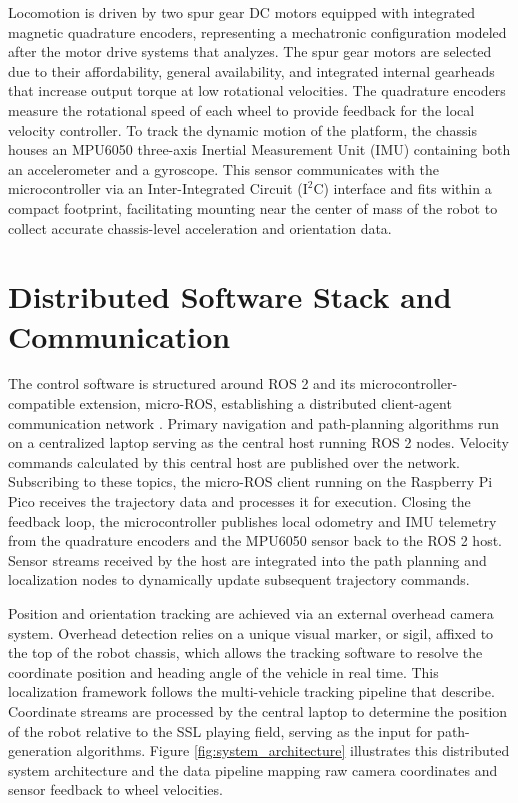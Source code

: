 \documentclass[a4paper,twoside,12pt]{report}
\begin{document}
Locomotion is driven by two spur gear DC motors equipped with integrated magnetic quadrature encoders, representing a mechatronic configuration modeled after the motor drive systems that \citet{salem2013} analyzes. The spur gear motors are selected due to their affordability, general availability, and integrated internal gearheads that increase output torque at low rotational velocities. The quadrature encoders measure the rotational speed of each wheel to provide feedback for the local velocity controller. To track the dynamic motion of the platform, the chassis houses an MPU6050 three-axis Inertial Measurement Unit (IMU) containing both an accelerometer and a gyroscope. This sensor communicates with the microcontroller via an Inter-Integrated Circuit ($\text{I}^2\text{C}$) interface and fits within a compact footprint, facilitating mounting near the center of mass of the robot to collect accurate chassis-level acceleration and orientation data.

\section{Distributed Software Stack and Communication}

The control software is structured around ROS 2 and its microcontroller-compatible extension, micro-ROS, establishing a distributed client-agent communication network \citep{macenski2022robot}. Primary navigation and path-planning algorithms run on a centralized laptop serving as the central host running ROS 2 nodes. Velocity commands calculated by this central host are published over the network. Subscribing to these topics, the micro-ROS client running on the Raspberry Pi Pico receives the trajectory data and processes it for execution. Closing the feedback loop, the microcontroller publishes local odometry and IMU telemetry from the quadrature encoders and the MPU6050 sensor back to the ROS 2 host. Sensor streams received by the host are integrated into the path planning and localization nodes to dynamically update subsequent trajectory commands.

Position and orientation tracking are achieved via an external overhead camera system. Overhead detection relies on a unique visual marker, or sigil, affixed to the top of the robot chassis, which allows the tracking software to resolve the coordinate position and heading angle of the vehicle in real time. This localization framework follows the multi-vehicle tracking pipeline that \citet{yu2017portable} describe. Coordinate streams are processed by the central laptop to determine the position of the robot relative to the SSL playing field, serving as the input for path-generation algorithms. Figure \ref{fig:system_architecture} illustrates this distributed system architecture and the data pipeline mapping raw camera coordinates and sensor feedback to wheel velocities.
\end{document}

